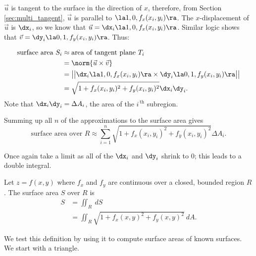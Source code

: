 $\vec u$ is tangent to the surface in the direction of $x$, therefore, from Section \ref{sec:multi_tangent}, $\vec u$ is parallel to $\la 1,0,f_x(x_i,y_i)\ra$. The $x$-displacement of $\vec u$ is $\dx_i$, so we know that $\vec u = \dx_i\la 1,0,f_x(x_i,y_i)\ra$. Similar logic shows that $\vec v = \dy_i\la 0,1,f_y(x_i,y_i)\ra$. Thus:

\begin{align*}
\text{surface area $S_i$} &\approx \text{area of tangent plane $T_i$}\\
				&= \norm{\vec u\times \vec v}\\
				&= \big|\big|\dx_i\la 1,0,f_x(x_i,y_i)\ra\times\dy_i\la 0,1,f_y(x_i,y_i)\ra\big|\big|\\
				&=\sqrt{1+f_x(x_i,y_i)^2+f_y(x_i,y_i)^2}\dx_i\dy_i.
\end{align*}
Note that $\dx_i\dy_i = \Delta A_i$, the area of the $i^{\,\text{th}}$ subregion.

Summing up all $n$ of the approximations to the surface area gives
$$\text{surface area over $R$} \approx \sum_{i=1}^n \sqrt{1+f_x(x_i,y_i)^2+f_y(x_i,y_i)^2}\Delta A_i.$$

Once again take a limit as all of the $\dx_i$ and $\dy_i$ shrink to 0; this leads to a double integral.

{Let $z=f(x,y)$ where $f_x$ and $f_y$ are continuous over a closed, bounded region $R$. The surface area $S$ over $R$ is
\begin{align*}
S &= \iint_R \ dS\\
&=\iint_R \sqrt{1+f_x(x,y)^2+f_y(x,y)^2}\ dA.
\end{align*}
}


We test this definition by using it to compute surface areas of known surfaces. We start with a triangle.
\enlargethispage{2\baselineskip}\\


